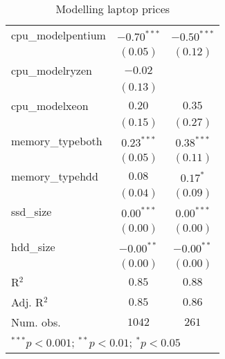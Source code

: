 \documentclass[
]{article}
\begin{document}
\begin{table}
\begin{center}
\begin{tabular}{l c c}
cpu\_modelpentium             & $-0.70^{***}$ & $-0.50^{***}$ \\
                              & $(0.05)$      & $(0.12)$      \\
cpu\_modelryzen               & $-0.02$       &               \\
                              & $(0.13)$      &               \\
cpu\_modelxeon                & $0.20$        & $0.35$        \\
                              & $(0.15)$      & $(0.27)$      \\
memory\_typeboth              & $0.23^{***}$  & $0.38^{***}$  \\
                              & $(0.05)$      & $(0.11)$      \\
memory\_typehdd               & $0.08$        & $0.17^{*}$    \\
                              & $(0.04)$      & $(0.09)$      \\
ssd\_size                     & $0.00^{***}$  & $0.00^{***}$  \\
                              & $(0.00)$      & $(0.00)$      \\
hdd\_size                     & $-0.00^{**}$  & $-0.00^{**}$  \\
                              & $(0.00)$      & $(0.00)$      \\
\hline
R$^2$                         & $0.85$        & $0.88$        \\
Adj. R$^2$                    & $0.85$        & $0.86$        \\
Num. obs.                     & $1042$        & $261$         \\
\hline
\multicolumn{3}{l}{\scriptsize{$^{***}p<0.001$; $^{**}p<0.01$; $^{*}p<0.05$}}
\end{tabular}
\caption{Modelling laptop prices}
\label{table:coefficients}
\end{center}
\end{table}
\end{document}
